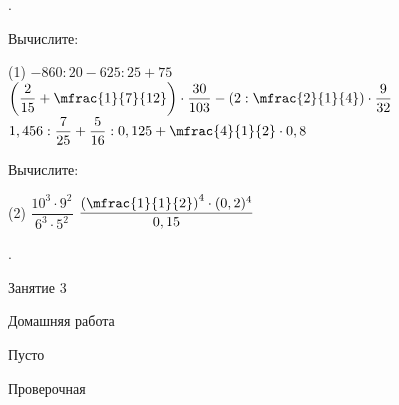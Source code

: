 %
%

\begin{class}[number=1]
	\begin{listofex}
		\item .
	\end{listofex}
\end{class}

\begin{homework}[number=1]
	\begin{listofex}
		\item Вычислите:
		\begin{tasks}(1)
			\task \(-860:20-625:25+75\)
			\task \( \left( \dfrac{2}{15}+\mfrac{1}{7}{12} \right)\cdot\dfrac{30}{103}-\left( 2:\mfrac{2}{1}{4} \right)\cdot\dfrac{9}{32} \)
			\task \( 1,456:\dfrac{7}{25}+\dfrac{5}{16}:0,125+\mfrac{4}{1}{2}\cdot0,8 \)
		\end{tasks}
		\item Вычислите:
		\begin{tasks}(2)
			\task \( \dfrac{10^3\cdot9^2}{6^3\cdot5^2} \)
			\task \( \dfrac{\left(  \mfrac{1}{1}{2} \right)^4\cdot(0,2)^4 }{0,15} \)
		\end{tasks}
	\end{listofex}
\end{homework}

\begin{class}[number=2]
	\begin{listofex}
		\item .
	\end{listofex}
\end{class}
\begin{class}[number=3]
	\begin{listofex}
		\item Занятие 3
	\end{listofex}
\end{class}

\begin{homework}[number=3]
	\begin{listofex}
		\item Домашняя работа
	\end{listofex}
\end{homework}

\begin{class}[number=4]
	\begin{listofex}
		\item Пусто
	\end{listofex}
\end{class}


\begin{exam}
	\begin{listofex}
		\item Проверочная
	\end{listofex}
\end{exam}
